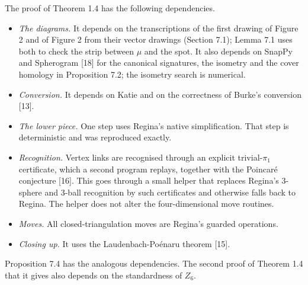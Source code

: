 \documentclass[11pt,letterpaper]{article}
\begin{document}
The proof of Theorem 1.4 has the following dependencies.
\begin{itemize}
\item \emph{The diagrams.} It depends on the transcriptions of the first drawing of Figure 2 and of Figure 2 from their vector drawings (Section 7.1); Lemma 7.1 uses both to check the strip between $\mu$ and the spot. It also depends on SnapPy and Spherogram [18] for the canonical signatures, the isometry and the cover homology in Proposition 7.2; the isometry search is numerical.
\item \emph{Conversion.} It depends on Katie and on the correctness of Burke's conversion [13].
\item \emph{The lower piece.} One step uses Regina's native simplification. That step is deterministic and was reproduced exactly.
\item \emph{Recognition.} Vertex links are recognised through an explicit trivial-$\pi_1$ certificate, which a second program replays, together with the Poincaré conjecture [16]. This goes through a small helper that replaces Regina's 3-sphere and 3-ball recognition by such certificates and otherwise falls back to Regina. The helper does not alter the four-dimensional move routines.
\item \emph{Moves.} All closed-triangulation moves are Regina's guarded operations.
\item \emph{Closing up.} It uses the Laudenbach-Poénaru theorem [15].
\end{itemize}
Proposition 7.4 has the analogous dependencies. The second proof of Theorem 1.4 that it gives also depends on the standardness of $Z_6$.
\end{document}
